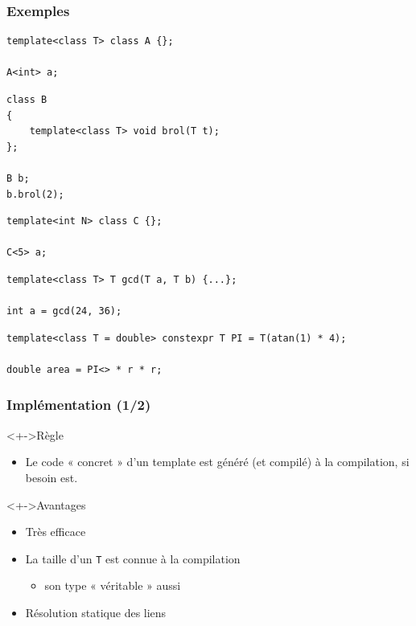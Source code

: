 \begin{frame}[containsverbatim]
\frametitle{Exemples}
\begin{lstlisting}
template<class T> class A {};

A<int> a;
\end{lstlisting}

\begin{lstlisting}
class B
{
	template<class T> void brol(T t);
};

B b;
b.brol(2);
\end{lstlisting}

\begin{lstlisting}
template<int N> class C {};

C<5> a;
\end{lstlisting}

\begin{lstlisting}
template<class T> T gcd(T a, T b) {...};

int a = gcd(24, 36);
\end{lstlisting}

\begin{lstlisting}
template<class T = double> constexpr T PI = T(atan(1) * 4);

double area = PI<> * r * r;
\end{lstlisting}
\end{frame}

\begin{frame}
\frametitle{Implémentation (1/2)}
\begin{block}<+->{Règle}
	\begin{itemize}
	\item Le code « concret » d'un template est généré (et compilé) à la compilation, si besoin est.
	\end{itemize}
\end{block}
\begin{exampleblock}<+->{Avantages}
	\begin{itemize}[<+->]
	\item Très efficace
	\item La taille d'un \texttt{T} est connue à la compilation
		\begin{itemize}
		\item son type « véritable » aussi
		\end{itemize}
	\item Résolution statique des liens
	\end{itemize}
\end{exampleblock}
\end{frame}

